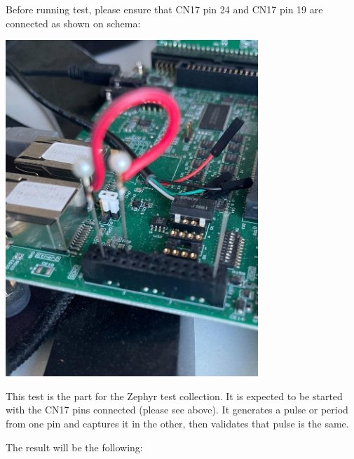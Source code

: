 \documentclass[11pt,a4paper,oneside]{article}
\begin{document}
Before running test, please ensure that CN17 pin 24 and CN17 pin 19 are
connected as shown on schema:

\includegraphics[width=3.75in,height=5in]{./media/image5.jpg}

This test is the part for the Zephyr test collection. It is expected to
be started with the CN17 pins connected (please see above). It generates
a pulse or period from one pin and captures it in the other, then
validates that pulse is the same.

The result will be the following:
\end{document}
